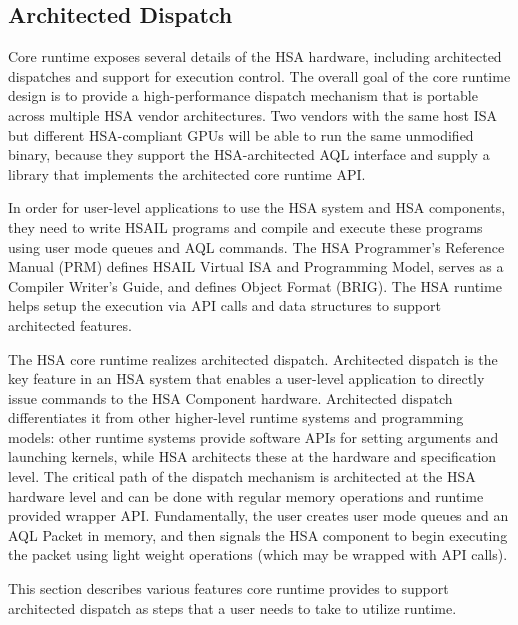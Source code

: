 \documentclass[draft]{book}
\begin{document}
\hypertarget{archdispatch}{}\subsection{Architected Dispatch}
\label{archdispatch}

Core runtime exposes several details of the HSA hardware, including architected
dispatches and support for execution control. The overall goal of the core
runtime design is to provide a high-\/performance dispatch mechanism that is
portable across multiple HSA vendor architectures. Two vendors with the same
host ISA but different HSA-\/compliant GPUs will be able to run the same
unmodified binary, because they support the HSA-\/architected AQL interface and
supply a library that implements the architected core runtime API.

In order for user-level applications to use the HSA system and HSA components,
they need to write HSAIL programs and compile and execute these programs using
user mode queues and AQL commands. The HSA Programmer's Reference Manual (PRM)
defines HSAIL Virtual ISA and Programming Model, serves as a Compiler Writer's
Guide, and defines Object Format (BRIG). The HSA runtime helps setup the
execution via API calls and data structures to support architected features.

The HSA core runtime realizes architected dispatch. Architected dispatch is the
key feature in an HSA system that enables a user-\/level application to directly
issue commands to the HSA Component hardware. Architected dispatch
differentiates it from other higher-\/level runtime systems and programming
models: other runtime systems provide software APIs for setting arguments and
launching kernels, while HSA architects these at the hardware and specification
level. The critical path of the dispatch mechanism is architected at the HSA
hardware level and can be done with regular memory operations and runtime
provided wrapper API. Fundamentally, the user creates user mode queues and an
AQL Packet in memory, and then signals the HSA component to begin executing the
packet using light weight operations (which may be wrapped with API calls).

This section describes various features core runtime provides to support
architected dispatch as steps that a user needs to take to utilize runtime.
\end{document}
